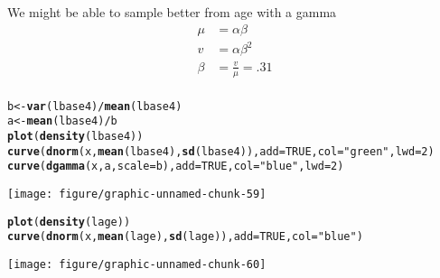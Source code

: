 \documentclass[12pt,letterpaper,oneside]{article}\usepackage{graphicx, color}
\makeatletter
\newcommand{\hlfunctioncall}[1]{\textcolor[rgb]{0.501960784313725,0,0.329411764705882}{\textbf{#1}}}%
\newcommand{\hlstring}[1]{\textcolor[rgb]{0.6,0.6,1}{#1}}%
\newenvironment{kframe}{%
 \def\at@end@of@kframe{}%
 \ifinner\ifhmode%
  \def\at@end@of@kframe{\end{minipage}}%
  \begin{minipage}{\columnwidth}%
 \fi\fi%
 \def\FrameCommand##1{\hskip\@totalleftmargin \hskip-\fboxsep
 \colorbox{shadecolor}{##1}\hskip-\fboxsep
     \hskip-\linewidth \hskip-\@totalleftmargin \hskip\columnwidth}%
 \MakeFramed {\advance\hsize-\width
   \@totalleftmargin\z@ \linewidth\hsize
   \@setminipage}}%
 {\par\unskip\endMakeFramed%
 \at@end@of@kframe}
\newenvironment{knitrout}{}{} %
\makeatother
\begin{document}
We might be able to sample better from age with a gamma
\begin{align*}
    \mu &= \alpha \beta\\
    v &= \alpha \beta^{2}\\
    \beta&=\frac{v}{\mu}= .31\\
\end{align*}
\begin{knitrout}\scriptsize
{}\color{fgcolor}\begin{kframe}
\begin{alltt}
b <- \hlfunctioncall{var}(lbase4)/\hlfunctioncall{mean}(lbase4)
a <- \hlfunctioncall{mean}(lbase4)/b
\hlfunctioncall{plot}(\hlfunctioncall{density}(lbase4))
\hlfunctioncall{curve}(\hlfunctioncall{dnorm}(x, \hlfunctioncall{mean}(lbase4), \hlfunctioncall{sd}(lbase4)), add = TRUE, col = \hlstring{"green"}, lwd = 2)
\hlfunctioncall{curve}(\hlfunctioncall{dgamma}(x, a, scale = b), add = TRUE, col = \hlstring{"blue"}, lwd = 2)
\end{alltt}
\end{kframe}

{\centering \texttt{[image: figure/graphic-unnamed-chunk-59]} 

}



\end{knitrout}


\begin{knitrout}\scriptsize
{}\color{fgcolor}\begin{kframe}
\begin{alltt}
\hlfunctioncall{plot}(\hlfunctioncall{density}(lage))
\hlfunctioncall{curve}(\hlfunctioncall{dnorm}(x, \hlfunctioncall{mean}(lage), \hlfunctioncall{sd}(lage)), add = TRUE, col = \hlstring{"blue"})
\end{alltt}
\end{kframe}

{\centering \texttt{[image: figure/graphic-unnamed-chunk-60]} 

}



\end{knitrout}
\end{document}
